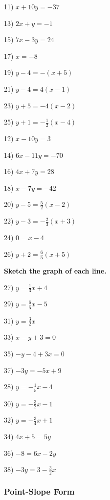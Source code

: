 \documentclass[11pt]{book}
\newcommand{\tmstrong}[1]{\textbf{#1}}
\theoremstyle{definition}  %
\begin{document}
\begin{multicols}{2}
  11) $x + 10 y = - 37$
  
  13) $2 x + y = - 1$
  
  15) $7 x - 3 y = 24$
  
  17) $x = - 8$
  
  19) $y - 4 = - (x + 5)$
  
  21) $y - 4 = 4 (x - 1)$
  
  23) $y + 5 = - 4 (x - 2)$
  
  25) $y + 1 = - \frac{1}{2} (x - 4)$
  
  12) $x - 10 y = 3$
  
  14) $6 x - 11 y = - 70$
  
  16) $4 x + 7 y = 28$
  
  18) $x - 7 y = - 42$
  
  20) $y - 5 = \frac{5}{2} (x - 2)$
  
  22) $y - 3 = - \frac{2}{3} (x + 3)$
  
  24) $0 = x - 4$
  
  26) $y + 2 = \frac{6}{5} (x + 5)$
\end{multicols}

{\tmstrong{Sketch the graph of each line.}}
\label{lineargraphs2}
\begin{multicols}{2}
  27) $y = \frac{1}{3} x + 4$
  
  29) $y = \frac{6}{5} x - 5$
  
  31) $y = \frac{3}{2} x$
  
  33) $x - y + 3 = 0$
  
  35) $- y - 4 + 3 x = 0$
  
  37) $- 3 y = - 5 x + 9$
  
  28) $y = - \frac{1}{5} x - 4$
  
  30) $y = - \frac{3}{2} x - 1$
  
  32) $y = - \frac{3}{4} x + 1$
  
  34) $4 x + 5 = 5 y$
  
  36) $- 8 = 6 x - 2 y$
  
  38) $- 3 y = 3 - \frac{3}{2} x$
\end{multicols}


\pagebreak

	\subsubsection{Point-Slope Form}\par
\end{document}
